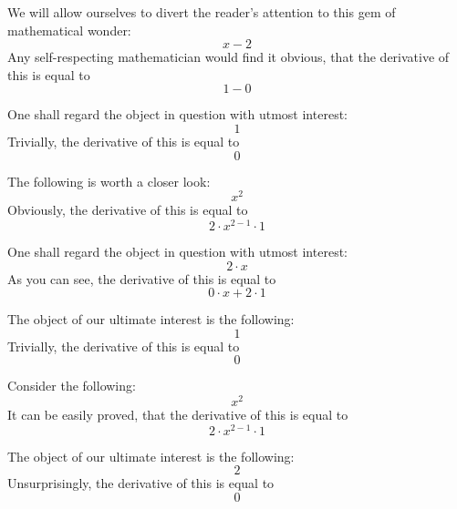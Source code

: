 \documentclass{article}
\begin{document}
We will allow ourselves to divert the reader's attention to this gem of mathematical wonder:
\begin{equation}
x - 2 
\end{equation}
Any self-respecting mathematician would find it obvious, that the derivative of this is equal to
\begin{equation}
1 - 0 
\end{equation}

One shall regard the object in question with utmost interest:
\begin{equation}
1 
\end{equation}
Trivially, the derivative of this is equal to
\begin{equation}
0 
\end{equation}

The following is worth a closer look:
\begin{equation}
x ^{2 } 
\end{equation}
Obviously, the derivative of this is equal to
\begin{equation}
2 \cdot x ^{2 - 1 } \cdot 1 
\end{equation}

One shall regard the object in question with utmost interest:
\begin{equation}
2 \cdot x 
\end{equation}
As you can see, the derivative of this is equal to
\begin{equation}
0 \cdot x + 2 \cdot 1 
\end{equation}

The object of our ultimate interest is the following:
\begin{equation}
1 
\end{equation}
Trivially, the derivative of this is equal to
\begin{equation}
0 
\end{equation}

Consider the following:
\begin{equation}
x ^{2 } 
\end{equation}
It can be easily proved, that the derivative of this is equal to
\begin{equation}
2 \cdot x ^{2 - 1 } \cdot 1 
\end{equation}

The object of our ultimate interest is the following:
\begin{equation}
2 
\end{equation}
Unsurprisingly, the derivative of this is equal to
\begin{equation}
0 
\end{equation}
\end{document}
